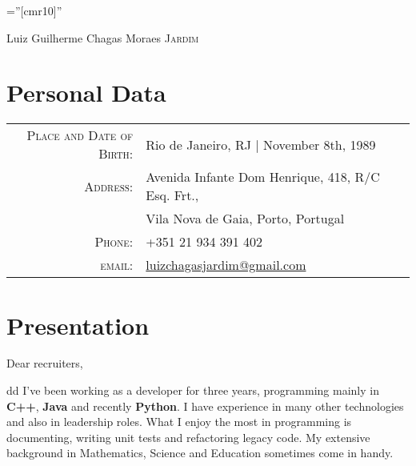 \documentclass[a4paper,10pt]{article}
\newcommand{\cvtype}{d}
\begin{document}

\pagestyle{empty} %

\font\fb=''[cmr10]'' %

\par{\centering
		{\Huge Luiz Guilherme Chagas Moraes \textsc{Jardim}
	}\bigskip\par}

\section{Personal Data}

\begin{tabular}{rl}
    \textsc{Place and Date of Birth:} & Rio de Janeiro, RJ  | November 8th, 1989 \\
    \textsc{Address:}   & Avenida Infante Dom Henrique, 418, R/C Esq. Frt.,\\& Vila Nova de Gaia, Porto, Portugal \\
    \textsc{Phone:}     & +351 21 934 391 402\\
    \textsc{email:}     & \href{mailto:luizchagasjardim@gmail.com}{luizchagasjardim@gmail.com} \\
\end{tabular}

\section{Presentation}
Dear recruiters,

\if \cvtype d
{\quad}I've been working as a developer for three years, programming mainly in \textbf{C++}, \textbf{Java} and recently \textbf{Python}. I have experience in many other technologies and also in leadership roles. What I enjoy the most in programming is documenting, writing unit tests and refactoring legacy code. My extensive background in Mathematics, Science and Education sometimes come in handy.
\end{document}
